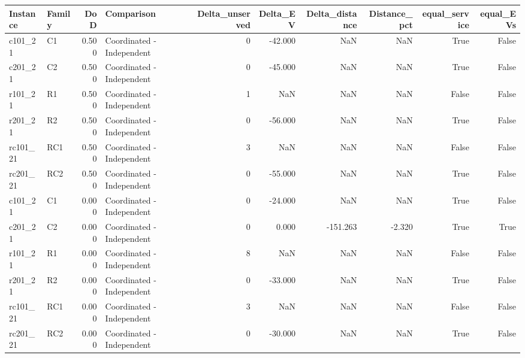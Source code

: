 \begin{tabular}{llrlrrrrrr}
\toprule
Instance & Family & DoD & Comparison & Delta\_unserved & Delta\_EV & Delta\_distance & Distance\_pct & equal\_service & equal\_EVs \\
\midrule
c101\_21 & C1 & 0.500 & Coordinated - Independent & 0 & -42.000 & NaN & NaN & True & False \\
c201\_21 & C2 & 0.500 & Coordinated - Independent & 0 & -45.000 & NaN & NaN & True & False \\
r101\_21 & R1 & 0.500 & Coordinated - Independent & 1 & NaN & NaN & NaN & False & False \\
r201\_21 & R2 & 0.500 & Coordinated - Independent & 0 & -56.000 & NaN & NaN & True & False \\
rc101\_21 & RC1 & 0.500 & Coordinated - Independent & 3 & NaN & NaN & NaN & False & False \\
rc201\_21 & RC2 & 0.500 & Coordinated - Independent & 0 & -55.000 & NaN & NaN & True & False \\
c101\_21 & C1 & 0.000 & Coordinated - Independent & 0 & -24.000 & NaN & NaN & True & False \\
c201\_21 & C2 & 0.000 & Coordinated - Independent & 0 & 0.000 & -151.263 & -2.320 & True & True \\
r101\_21 & R1 & 0.000 & Coordinated - Independent & 8 & NaN & NaN & NaN & False & False \\
r201\_21 & R2 & 0.000 & Coordinated - Independent & 0 & -33.000 & NaN & NaN & True & False \\
rc101\_21 & RC1 & 0.000 & Coordinated - Independent & 3 & NaN & NaN & NaN & False & False \\
rc201\_21 & RC2 & 0.000 & Coordinated - Independent & 0 & -30.000 & NaN & NaN & True & False \\
\bottomrule
\end{tabular}
